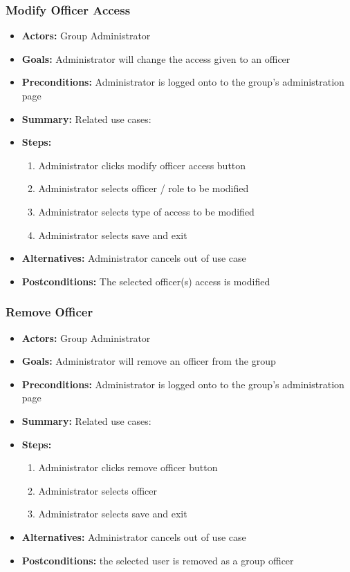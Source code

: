 \documentclass[12pt, oneside, letterpaper]{report}
\begin{document}
			\subsubsection{Modify Officer Access}
			\begin{itemize}
				\item{\textbf{Actors:} Group Administrator}
				\item{\textbf{Goals:} Administrator will change the access given to an officer}
				\item{\textbf{Preconditions:} Administrator is logged onto to the group's administration page}
				\item{\textbf{Summary:} Related use cases:}
				\item{\textbf{Steps:}
				\begin{enumerate}
					\item{Administrator clicks modify officer access
						button}
					\item{Administrator selects officer / role to be
						modified}
					\item{Administrator selects type of access to be
						modified}
					\item{Administrator selects save and exit}
				\end{enumerate}
				}
				\item{\textbf{Alternatives:} Administrator cancels out of
					use case}
				\item{\textbf{Postconditions:} The selected officer(s)
					access is modified}
			\end{itemize}

			\subsubsection{Remove Officer}
			\begin{itemize}
				\item{\textbf{Actors:} Group Administrator}
				\item{\textbf{Goals:} Administrator will remove an officer
					from the group}
				\item{\textbf{Preconditions:} Administrator is logged onto
					to the group's administration page}
				\item{\textbf{Summary:} Related use cases:}
				\item{\textbf{Steps:}
				\begin{enumerate}
					\item{Administrator clicks remove officer button}
					\item{Administrator selects officer}
					\item{Administrator selects save and exit}
				\end{enumerate}
				}
				\item{\textbf{Alternatives:} Administrator cancels out of
					use case}
				\item{\textbf{Postconditions:} the selected user is
					removed as a group officer}
			\end{itemize}
\end{document}
